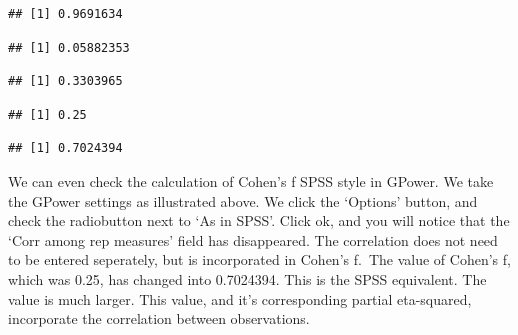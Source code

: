 \documentclass[]{book}
\newenvironment{Shaded}{\begin{snugshade}}{\end{snugshade}}
\newcommand{\DecValTok}[1]{\textcolor[rgb]{0.00,0.00,0.81}{#1}}
\newcommand{\KeywordTok}[1]{\textcolor[rgb]{0.13,0.29,0.53}{\textbf{#1}}}
\newcommand{\NormalTok}[1]{#1}
\newcommand{\OperatorTok}[1]{\textcolor[rgb]{0.81,0.36,0.00}{\textbf{#1}}}
\begin{document}
\begin{verbatim}
## [1] 0.9691634
\end{verbatim}

\begin{Shaded}
\end{Shaded}

\begin{verbatim}
## [1] 0.05882353
\end{verbatim}

\begin{Shaded}
\end{Shaded}

\begin{verbatim}
## [1] 0.3303965
\end{verbatim}

\begin{Shaded}
\end{Shaded}

\begin{verbatim}
## [1] 0.25
\end{verbatim}

\begin{Shaded}
\end{Shaded}

\begin{verbatim}
## [1] 0.7024394
\end{verbatim}

We can even check the calculation of Cohen's f SPSS style in GPower. We take the GPower settings as illustrated above. We click the `Options' button, and check the radiobutton next to `As in SPSS'. Click ok, and you will notice that the `Corr among rep measures' field has disappeared. The correlation does not need to be entered seperately, but is incorporated in Cohen's f.~The value of Cohen's f, which was 0.25, has changed into 0.7024394. This is the SPSS equivalent. The value is much larger. This value, and it's corresponding partial eta-squared, incorporate the correlation between observations.
\end{document}
